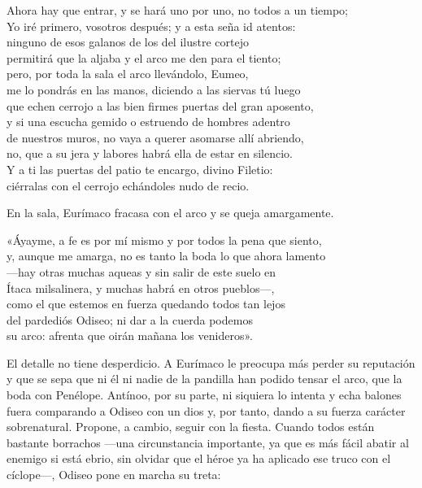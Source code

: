 \begin{versocita}
Ahora hay que entrar, y se hará uno por uno, no todos a un tiempo;\\
Yo iré primero, vosotros después; y a esta seña id atentos:\\
ninguno de esos galanos de los del ilustre cortejo\\
permitirá que la aljaba y el arco me den para el tiento;\\
pero, por toda la sala el arco llevándolo, Eumeo,\\
me lo pondrás en las manos, diciendo a las siervas tú luego\\
que echen cerrojo a las bien firmes puertas del gran aposento,\\
y si una escucha gemido o estruendo de hombres adentro\\
de nuestros muros, no vaya a querer asomarse allí abriendo,\\
no, que a su jera y labores habrá ella de estar en silencio.\\
Y a ti las puertas del patio te encargo, divino Filetio:\\
ciérralas con el cerrojo echándoles nudo de recio.
\end{versocita}

En la sala, Eurímaco fracasa con el arco y se queja amargamente.

\begin{versocita}
«Áyayme, a fe es por mí mismo y por todos la pena que siento,\\
y, aunque me amarga, no es tanto la boda lo que ahora lamento\\
---hay otras muchas aqueas y sin salir de este suelo en\\
Ítaca milsalinera, y muchas habrá en otros pueblos---,\\
como el que estemos en fuerza quedando todos tan lejos\\
del pardediós Odiseo; ni dar a la cuerda podemos\\
su arco: afrenta que oirán mañana los venideros».
\end{versocita}

El detalle no tiene desperdicio. A Eurímaco le preocupa más perder su reputación y que se sepa que ni él ni nadie de la pandilla han podido tensar el arco, que la boda con Penélope. Antínoo, por su parte, ni siquiera lo intenta y echa balones fuera comparando a Odiseo con un dios y, por tanto, dando a su fuerza carácter sobrenatural. Propone, a cambio, seguir con la fiesta. Cuando todos están bastante borrachos ---una circunstancia importante, ya que es más fácil abatir al enemigo si está ebrio, sin olvidar que el héroe ya ha aplicado ese truco con el cíclope---, Odiseo pone en marcha su treta:

